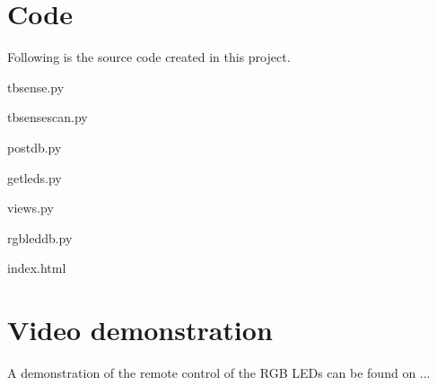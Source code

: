 \chapter{Code}
Following is the source code created in this project. 

tbsense.py

tbsense\textunderscore scan.py

post\textunderscore db.py

get\textunderscore leds.py

views.py

rgbled\textunderscore db.py

index.html


\chapter{Video demonstration}
A demonstration of the remote control of the RGB LEDs can be found on ...

